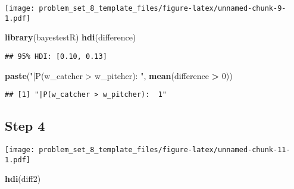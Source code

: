 \documentclass[
]{article}
\newenvironment{Shaded}{\begin{snugshade}}{\end{snugshade}}
\newcommand{\AttributeTok}[1]{\textcolor[rgb]{0.13,0.29,0.53}{#1}}
\newcommand{\DecValTok}[1]{\textcolor[rgb]{0.00,0.00,0.81}{#1}}
\newcommand{\FunctionTok}[1]{\textcolor[rgb]{0.13,0.29,0.53}{\textbf{#1}}}
\newcommand{\NormalTok}[1]{#1}
\newcommand{\OtherTok}[1]{\textcolor[rgb]{0.56,0.35,0.01}{#1}}
\newcommand{\SpecialCharTok}[1]{\textcolor[rgb]{0.81,0.36,0.00}{\textbf{#1}}}
\newcommand{\StringTok}[1]{\textcolor[rgb]{0.31,0.60,0.02}{#1}}
\begin{document}
\texttt{[image: problem\_set\_8\_template\_files/figure-latex/unnamed-chunk-9-1.pdf]}

\begin{Shaded}
\begin{Highlighting}[]
\FunctionTok{library}\NormalTok{(bayestestR)}
\FunctionTok{hdi}\NormalTok{(difference)}
\end{Highlighting}
\end{Shaded}

\begin{verbatim}
## 95% HDI: [0.10, 0.13]
\end{verbatim}

\begin{Shaded}
\begin{Highlighting}[]
\FunctionTok{paste}\NormalTok{(}\StringTok{"|P(w\_catcher \textgreater{} w\_pitcher): "}\NormalTok{, }\FunctionTok{mean}\NormalTok{(difference }\SpecialCharTok{\textgreater{}} \DecValTok{0}\NormalTok{))}
\end{Highlighting}
\end{Shaded}

\begin{verbatim}
## [1] "|P(w_catcher > w_pitcher):  1"
\end{verbatim}

\hypertarget{step-4}{%
\subsection{Step 4}\label{step-4}}

\begin{Shaded}
\end{Shaded}

\texttt{[image: problem\_set\_8\_template\_files/figure-latex/unnamed-chunk-11-1.pdf]}

\begin{Shaded}
\begin{Highlighting}[]
\FunctionTok{hdi}\NormalTok{(diff2)}
\end{Highlighting}
\end{Shaded}
\end{document}

